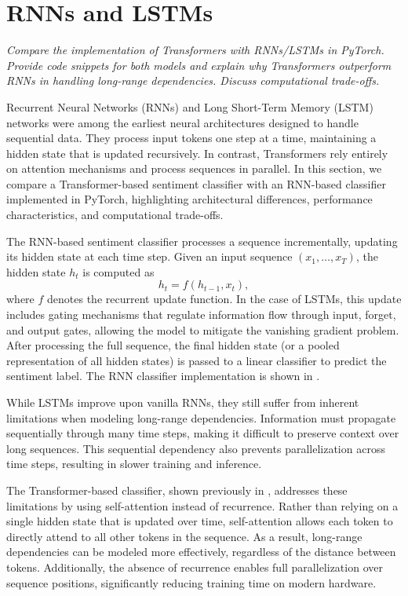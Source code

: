 \section{RNNs and LSTMs}
\textit{Compare the implementation of Transformers with RNNs/LSTMs in PyTorch.
Provide code snippets for both models and explain why Transformers outperform
RNNs in handling long-range dependencies. Discuss computational trade-offs.}

Recurrent Neural Networks (RNNs) and Long Short-Term Memory
(LSTM) networks were among the earliest neural architectures
designed to handle sequential data.
They process input tokens one step at a time, maintaining
a hidden state that is updated recursively.
In contrast, Transformers rely entirely on attention
mechanisms and process sequences in parallel.
In this section, we compare a Transformer-based sentiment
classifier with an RNN-based classifier implemented in
PyTorch, highlighting architectural differences, performance
characteristics, and computational trade-offs.

The RNN-based sentiment classifier processes a sequence
incrementally, updating its hidden state at each time step.
Given an input sequence $(x_1, \dots, x_T)$, the hidden state
$h_t$ is computed as
\begin{equation}
h_t = f(h_{t-1}, x_t),
\end{equation}
where $f$ denotes the recurrent update function.
In the case of LSTMs, this update includes gating mechanisms
that regulate information flow through input, forget, and
output gates, allowing the model to mitigate the vanishing
gradient problem.
After processing the full sequence, the final hidden state
(or a pooled representation of all hidden states) is passed
to a linear classifier to predict the sentiment label.
The RNN classifier implementation is shown in
.


While LSTMs improve upon vanilla RNNs, they still suffer
from inherent limitations when modeling long-range
dependencies.
Information must propagate sequentially through many time
steps, making it difficult to preserve context over long
sequences.
This sequential dependency also prevents parallelization
across time steps, resulting in slower training and inference.

The Transformer-based classifier, shown previously in
, addresses these limitations by using
self-attention instead of recurrence.
Rather than relying on a single hidden state that is updated
over time, self-attention allows each token to directly
attend to all other tokens in the sequence.
As a result, long-range dependencies can be modeled more
effectively, regardless of the distance between tokens.
Additionally, the absence of recurrence enables full
parallelization over sequence positions, significantly
reducing training time on modern hardware.

